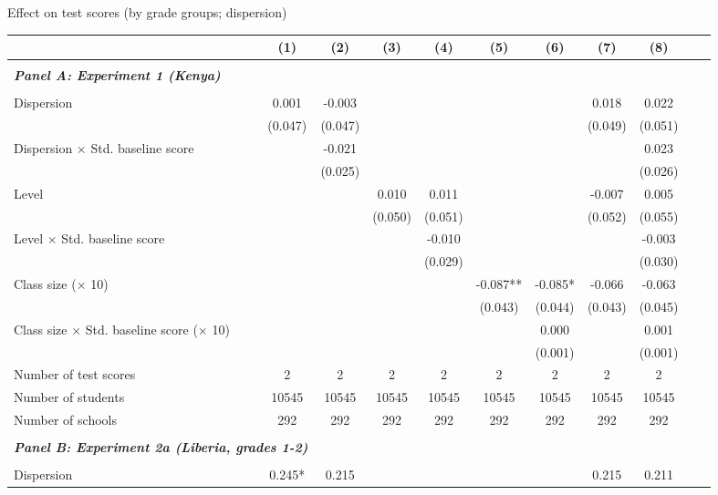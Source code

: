 \begin{center} 
\caption{\small Effect on test scores (by grade groups; dispersion)} 
\label{tab:descriptives} 
\begin{scriptsize}
\begin{threeparttable}
\begin{tabular} {@{} l l c c c c c c c c c c  @{}} \toprule \toprule
& &(1)&(2)&(3)&(4)&(5)&(6)&(7)&(8) \\ \midrule 
\\
\multicolumn{3}{l}{\textbf{\textit{Panel A: Experiment 1 (Kenya)}}} \\
\\
Dispersion &  & 0.001 & -0.003 &  &  &  &  & 0.018 & 0.022 \\
                 &  & (0.047) & (0.047) &  &  &  &  & (0.049) & (0.051) \\
Dispersion $\times$ Std. baseline score &  &  & -0.021 &  &  &  &  &  & 0.023 \\
                 &  &  & (0.025) &  &  &  &  &  & (0.026) \\
Level &  &  &  & 0.010 & 0.011 &  &  & -0.007 & 0.005 \\
                 &  &  &  & (0.050) & (0.051) &  &  & (0.052) & (0.055) \\
Level $\times$ Std. baseline score &  &  &  &  & -0.010 &  &  &  & -0.003 \\
                 &  &  &  &  & (0.029) &  &  &  & (0.030) \\
Class size ($\times$ 10) &  &  &  &  &  & -0.087** & -0.085* & -0.066 & -0.063 \\
                 &  &  &  &  &  & (0.043) & (0.044) & (0.043) & (0.045) \\
Class size $\times$ Std. baseline score ($\times$ 10) &  &  &  &  &  &  & 0.000 &  & 0.001 \\
                 &  &  &  &  &  &  & (0.001) &  & (0.001) \\
\midrule
Number of test scores &  & 2 & 2 & 2 & 2 & 2 & 2 & 2 & 2 \\
Number of students &  & 10545 & 10545 & 10545 & 10545 & 10545 & 10545 & 10545 & 10545 \\
Number of schools &  & 292 & 292 & 292 & 292 & 292 & 292 & 292 & 292 \\
 \midrule
\\
\multicolumn{3}{l}{\textbf{\textit{Panel B: Experiment 2a (Liberia, grades 1-2)}}} \\
\\
Dispersion &  & 0.245* & 0.215 &  &  &  &  & 0.215 & 0.211 \\

\end{tabular}
\end{threeparttable}
\end{scriptsize}
\end{center}
